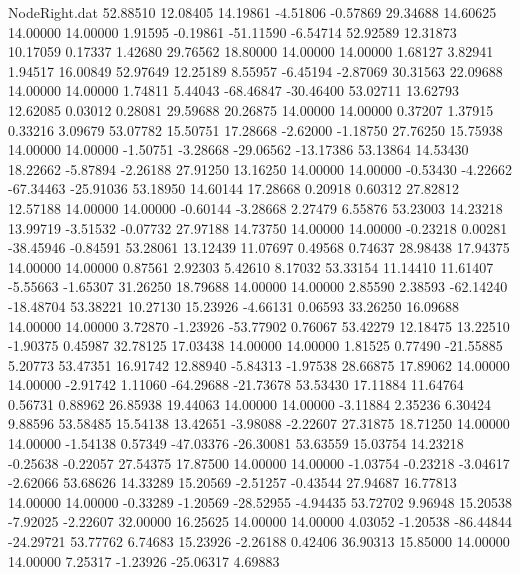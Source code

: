\begin{filecontents}{NodeRight.dat}
  52.88510   12.08405   14.19861    -4.51806   -0.57869   29.34688   14.60625   14.00000   14.00000    1.91595   -0.19861  -51.11590   -6.54714
  52.92589   12.31873   10.17059     0.17337    1.42680   29.76562   18.80000   14.00000   14.00000    1.68127    3.82941    1.94517   16.00849
  52.97649   12.25189    8.55957    -6.45194   -2.87069   30.31563   22.09688   14.00000   14.00000    1.74811    5.44043  -68.46847  -30.46400
  53.02711   13.62793   12.62085     0.03012    0.28081   29.59688   20.26875   14.00000   14.00000    0.37207    1.37915    0.33216    3.09679
  53.07782   15.50751   17.28668    -2.62000   -1.18750   27.76250   15.75938   14.00000   14.00000   -1.50751   -3.28668  -29.06562  -13.17386
  53.13864   14.53430   18.22662    -5.87894   -2.26188   27.91250   13.16250   14.00000   14.00000   -0.53430   -4.22662  -67.34463  -25.91036
  53.18950   14.60144   17.28668     0.20918    0.60312   27.82812   12.57188   14.00000   14.00000   -0.60144   -3.28668    2.27479    6.55876
  53.23003   14.23218   13.99719    -3.51532   -0.07732   27.97188   14.73750   14.00000   14.00000   -0.23218    0.00281  -38.45946   -0.84591
  53.28061   13.12439   11.07697     0.49568    0.74637   28.98438   17.94375   14.00000   14.00000    0.87561    2.92303    5.42610    8.17032
  53.33154   11.14410   11.61407    -5.55663   -1.65307   31.26250   18.79688   14.00000   14.00000    2.85590    2.38593  -62.14240  -18.48704
  53.38221   10.27130   15.23926    -4.66131    0.06593   33.26250   16.09688   14.00000   14.00000    3.72870   -1.23926  -53.77902    0.76067
  53.42279   12.18475   13.22510    -1.90375    0.45987   32.78125   17.03438   14.00000   14.00000    1.81525    0.77490  -21.55885    5.20773
  53.47351   16.91742   12.88940    -5.84313   -1.97538   28.66875   17.89062   14.00000   14.00000   -2.91742    1.11060  -64.29688  -21.73678
  53.53430   17.11884   11.64764     0.56731    0.88962   26.85938   19.44063   14.00000   14.00000   -3.11884    2.35236    6.30424    9.88596
  53.58485   15.54138   13.42651    -3.98088   -2.22607   27.31875   18.71250   14.00000   14.00000   -1.54138    0.57349  -47.03376  -26.30081
  53.63559   15.03754   14.23218    -0.25638   -0.22057   27.54375   17.87500   14.00000   14.00000   -1.03754   -0.23218   -3.04617   -2.62066
  53.68626   14.33289   15.20569    -2.51257   -0.43544   27.94687   16.77813   14.00000   14.00000   -0.33289   -1.20569  -28.52955   -4.94435
  53.72702    9.96948   15.20538    -7.92025   -2.22607   32.00000   16.25625   14.00000   14.00000    4.03052   -1.20538  -86.44844  -24.29721
  53.77762    6.74683   15.23926    -2.26188    0.42406   36.90313   15.85000   14.00000   14.00000    7.25317   -1.23926  -25.06317    4.69883

\end{filecontents}
